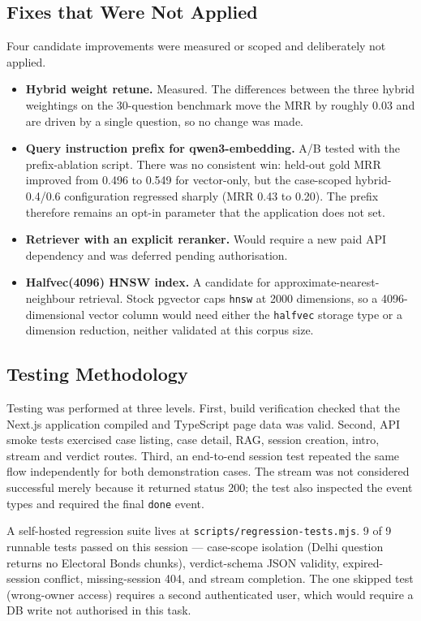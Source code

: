 \documentclass[12pt]{article}
\begin{document}
\subsection{Fixes that Were Not Applied}
Four candidate improvements were measured or scoped and deliberately not applied.
\begin{itemize}
\item \textbf{Hybrid weight retune.} Measured. The differences between the three hybrid weightings on the 30-question benchmark move the MRR by roughly $0.03$ and are driven by a single question, so no change was made.
\item \textbf{Query instruction prefix for qwen3-embedding.} A/B tested with the prefix-ablation script. There was no consistent win: held-out gold MRR improved from 0.496 to 0.549 for vector-only, but the case-scoped hybrid-0.4/0.6 configuration regressed sharply (MRR 0.43 to 0.20). The prefix therefore remains an opt-in parameter that the application does not set.
\item \textbf{Retriever with an explicit reranker.} Would require a new paid API dependency and was deferred pending authorisation.
\item \textbf{Halfvec(4096) HNSW index.} A candidate for approximate-nearest-neighbour retrieval. Stock pgvector caps \texttt{hnsw} at 2000 dimensions, so a 4096-dimensional vector column would need either the \texttt{halfvec} storage type or a dimension reduction, neither validated at this corpus size.
\end{itemize}

\subsection{Testing Methodology}
Testing was performed at three levels. First, build verification checked that the Next.js application compiled and TypeScript page data was valid. Second, API smoke tests exercised case listing, case detail, RAG, session creation, intro, stream and verdict routes. Third, an end-to-end session test repeated the same flow independently for both demonstration cases. The stream was not considered successful merely because it returned status 200; the test also inspected the event types and required the final \texttt{done} event.

A self-hosted regression suite lives at \texttt{scripts/regression-tests.mjs}. 9 of 9 runnable tests passed on this session --- case-scope isolation (Delhi question returns no Electoral Bonds chunks), verdict-schema JSON validity, expired-session conflict, missing-session 404, and stream completion. The one skipped test (wrong-owner access) requires a second authenticated user, which would require a DB write not authorised in this task.
\end{document}
